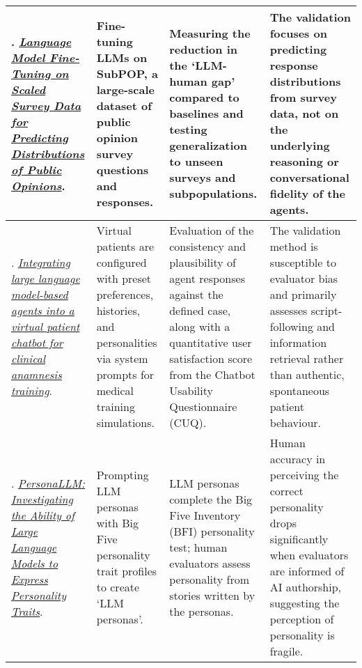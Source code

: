 {\begin{longtable}{| L{4.5cm} | L{3.5cm} | L{3.5cm} | L{3.5cm} |}
\\\hline
\citet{suh2025language}. \href{https://arxiv.org/abs/2502.16761}{\textit{Language Model Fine-Tuning on Scaled Survey Data for Predicting Distributions of Public Opinions}}. & Fine-tuning LLMs on SubPOP, a large-scale dataset of public opinion survey questions and responses. & Measuring the reduction in the `LLM-human gap' compared to baselines and testing generalization to unseen surveys and subpopulations. & The validation focuses on predicting response distributions from survey data, not on the underlying reasoning or conversational fidelity of the agents.
\\\hline
\citet{laverde2025integrating}. \href{https://doi.org/10.1016/j.csbj.2025.05.025}{\textit{Integrating large language model-based agents into a virtual patient chatbot for clinical anamnesis training}}. & Virtual patients are configured with preset preferences, histories, and personalities via system prompts for medical training simulations. & Evaluation of the consistency and plausibility of agent responses against the defined case, along with a quantitative user satisfaction score from the Chatbot Usability Questionnaire (CUQ). & The validation method is susceptible to evaluator bias and primarily assesses script-following and information retrieval rather than authentic, spontaneous patient behaviour.
\\\hline
\citet{jiang-etal-2023-personallm}. \href{https://aclanthology.org/2024.findings-naacl.229/}{\textit{PersonaLLM: Investigating the Ability of Large Language Models to Express Personality Traits}}. & Prompting LLM personas with Big Five personality trait profiles to create `LLM personas'. & LLM personas complete the Big Five Inventory (BFI) personality test; human evaluators assess personality from stories written by the personas. & Human accuracy in perceiving the correct personality drops significantly when evaluators are informed of AI authorship, suggesting the perception of personality is fragile.
\\\hline

\end{longtable}
} %
